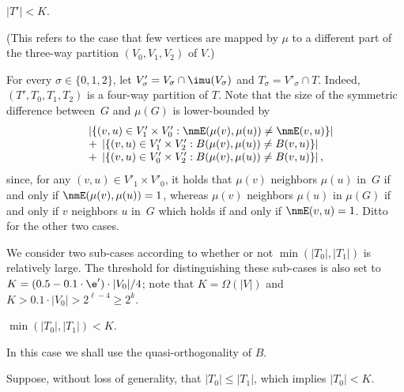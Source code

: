 %
\item[{\em Case 2}:] $|T'|<K$.

(This refers to the case that few vertices are mapped by $\mu$
to a different part of the three-way partition $(V_0,V_1,V_2)$ of $V$.)

For every $\sigma\in\{0,1,2\}$,
let $V'_\sigma=V_\sigma\cap\imu(V_\sigma)$ and $T_\sigma=V'_\sigma\cap T$.
Indeed, $(T',T_0,T_1,T_2)$ is a four-way partition of $T$.
Note that the size of the symmetric difference between~$G$ and $\mu(G)$
is lower-bounded by
\begin{equation}\label{diff-vs-nmE-tri:eq}
\begin{array}{ll}
&\left|\{(v,u)\in V'_1\times V'_0:\nmE(\mu(v),\mu(u))\neq\nmE(v,u)\}\right| \\
&+\;\left|\{(v,u)\in V'_1\times V'_2:B(\mu(v),\mu(u))\neq B(v,u)\}\right| \\
&+\;\left|\{(v,u)\in V'_0\times V'_2:B(\mu(v),\mu(u))\neq B(v,u)\}\right|,
\end{array}
\end{equation}
since, for any $(v,u)\in V'_1\times V'_0$,
it holds that $\mu(v)$ neighbors $\mu(u)$ in~$G$
if and only if $\nmE(\mu(v),\allowbreak \mu(u))=1$,
whereas $\mu(v)$ neighbors $\mu(u)$ in $\mu(G)$
if and only if $v$ neighbors $u$ in~$G$
which holds if and only if $\nmE(v,u)=1$.
Ditto for the other two cases.
%
%
%
%
%
%
%
%
%
%
%

We consider two sub-cases according to
whether or not $\min(|T_0|,|T_1|)$ is relatively large.
The threshold for distinguishing these sub-cases is also set
to $K=(0.5-0.1\cdot\e')\cdot|V_0|/4$;
note that $K=\Omega(|V|)$ and $K>0.1\cdot|V_0|>2^{\ell-4}\geq2^k$.
%
%
%
%

\BDes
\item[{\em Case 2.1}:] $\min(|T_0|,|T_1|)<K$.
%
%

In this case we shall use the quasi-orthogonality of $B$.

Suppose, without loss of generality, that $|T_0|\leq|T_1|$,
which implies $|T_0|<K$. 

